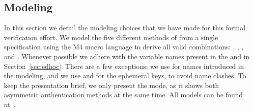  
%

%

 

\subsection{Modeling \mEdhoc{}}
\label{sec:modeling} 
In this section we detail the modeling choices that we have made for this formal
verification effort.
%
We model the five different methods of \mEdhoc{} from a single specification
using the M4 macro language to derive all valid combinations: \mPskPsk,
\mSigSig, \mSigStat, \mStatSig{} and \mStatStat.
%
Whenever possible we adhere with the variable names present in the \mSpec{} and
in Section~\ref{sec:edhoc}.
%
There are a few exceptions: we use  for names introduced in the modeling, and we use  and
 for the ephemeral keys, to avoid name clashes.
%
To keep the presentation brief, we only present the \mStatSig{} mode, as it
shows both asymmetric authentication methods at the same time.
%
All \mTamarin{} models can be
found at~\cite{edhocTamarinRepo}.
\\
%

